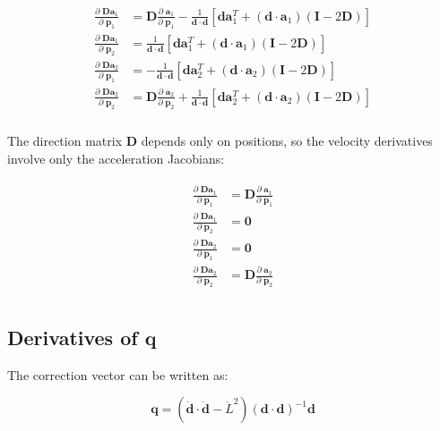 \documentclass[]{article}
\newcommand{\pd}[2]{\frac{\partial\;#1}{\partial\;#2}}
\begin{document}
\begin{align}
\begin{split}
    \pd{\mathbf{D} \mathbf{a}_1}{\mathbf{p}_1} &= \mathbf{D} \pd{\mathbf{a}_1}{\mathbf{p}_1} - \frac{1}{\mathbf{d} \cdot \mathbf{d}} \left[ \mathbf{d} \mathbf{a}_1^T + (\mathbf{d}\cdot\mathbf{a}_1) (\mathbf{I} - 2 \mathbf{D}) \right] \\
    \pd{\mathbf{D} \mathbf{a}_1}{\mathbf{p}_2} &= \frac{1}{\mathbf{d} \cdot \mathbf{d}} \left[ \mathbf{d} \mathbf{a}_1^T + (\mathbf{d}\cdot\mathbf{a}_1) (\mathbf{I} - 2 \mathbf{D}) \right] \\
    \pd{\mathbf{D} \mathbf{a}_2}{\mathbf{p}_1} &= -\frac{1}{\mathbf{d} \cdot \mathbf{d}} \left[ \mathbf{d} \mathbf{a}_2^T + (\mathbf{d}\cdot\mathbf{a}_2) (\mathbf{I} - 2 \mathbf{D}) \right] \\
    \pd{\mathbf{D} \mathbf{a}_2}{\mathbf{p}_2} &= \mathbf{D} \pd{\mathbf{a}_2}{\mathbf{p}_2} + \frac{1}{\mathbf{d} \cdot \mathbf{d}} \left[ \mathbf{d} \mathbf{a}_2^T + (\mathbf{d}\cdot\mathbf{a}_2) (\mathbf{I} - 2 \mathbf{D}) \right] \\
\end{split}
\end{align}

The direction matrix $\mathbf{D}$ depends only on positions, so the velocity derivatives involve only the acceleration Jacobians:

\begin{align}
\begin{split}
    \pd{\mathbf{D} \mathbf{a}_1}{\dot{\mathbf{p}}_1} &= \mathbf{D} \pd{\mathbf{a}_1}{\dot{\mathbf{p}}_1} \\
    \pd{\mathbf{D} \mathbf{a}_1}{\dot{\mathbf{p}}_2} &= \mathbf{0} \\
    \pd{\mathbf{D} \mathbf{a}_2}{\dot{\mathbf{p}}_1} &= \mathbf{0} \\
    \pd{\mathbf{D} \mathbf{a}_2}{\dot{\mathbf{p}}_2} &= \mathbf{D} \pd{\mathbf{a}_2}{\dot{\mathbf{p}}_2} \\
\end{split}
\end{align}

\subsection{Derivatives of $\mathbf{q}$}

The correction vector can be written as:

\begin{equation}
    \mathbf{q} = (\dot{\mathbf{d}} \cdot \dot{\mathbf{d}} - \dot{L}^2) (\mathbf{d} \cdot \mathbf{d})^{-1} \mathbf{d}
\end{equation}
\end{document}
